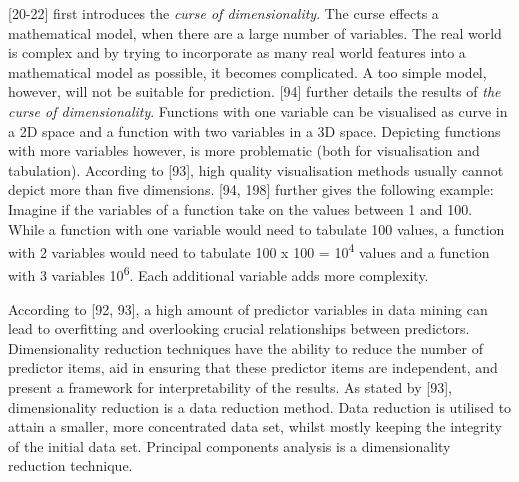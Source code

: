 \textcite{bellman1957dynamic}[20-22] first introduces the \textit{curse of dimensionality}. The curse effects a mathematical model, when there are a large number of variables. The real world is complex and by trying to incorporate as many real world features into a mathematical model as possible, it becomes complicated. A too simple model, however, will not be suitable for prediction. 
\textcite{bellman1961adaptive}[94] further details the results of \textit{the curse of dimensionality}. Functions with one variable can be visualised as curve in a 2D space and a function with two variables in a 3D space. Depicting functions with more variables however, is more problematic (both for visualisation and tabulation). According to \textcite{DataMiningAndPredictiveAnalytics}[93], high quality visualisation methods usually cannot depict more than five dimensions.
\textcite{bellman1961adaptive}[94, 198] further gives the following example: Imagine if the variables of a function take on the values between 1 and 100. While a function with one variable would need to tabulate 100 values, a function with 2 variables would need to tabulate 100 x 100 = 10\textsuperscript{4} values and a function with 3 variables 10\textsuperscript{6}. Each additional variable adds more complexity.






According to \textcite{DataMiningAndPredictiveAnalytics}[92, 93], a high amount of predictor variables in data mining can lead to overfitting and overlooking crucial relationships between predictors. Dimensionality reduction techniques have the ability to reduce the number of predictor items, aid in ensuring that these predictor items are independent, and present a framework for interpretability of the results.
As stated by \textcite{han2011data}[93], dimensionality reduction is a data reduction method. Data reduction is utilised to attain a smaller, more concentrated data set, whilst mostly keeping the integrity of the initial data set. Principal components analysis is a dimensionality reduction technique.




